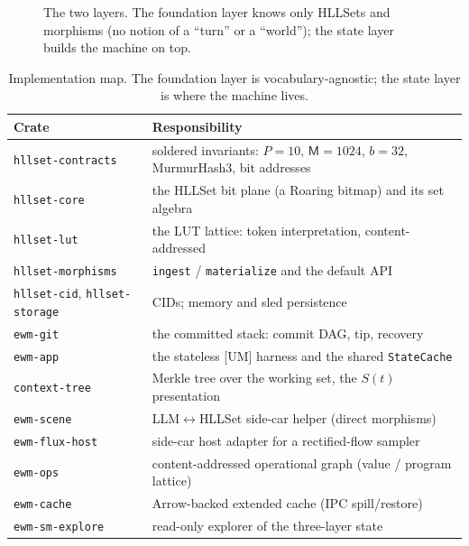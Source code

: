 \documentclass[11pt,a4paper]{article}
\theoremstyle{remark}
\newcommand{\Reg}{\ensuremath{\mathsf{M}}}            %
\newcommand{\Prec}{\ensuremath{P}}                    %
\newcommand{\Bits}{\ensuremath{b}}                    %
\begin{document}
\begin{figure}[t]
\caption{The two layers. The foundation layer knows only HLLSets and morphisms
(no notion of a ``turn'' or a ``world''); the state layer builds the machine on
top.}
\label{fig:layers}
\end{figure}

\begin{table}[t]
\centering
\small
\begin{tabular}{@{}p{}p{}@{}}
\toprule
Crate & Responsibility \\
\midrule
\texttt{hllset-contracts} & soldered invariants: $\Prec=10$, $\Reg=1024$, $\Bits=32$, MurmurHash3, bit addresses \\
\texttt{hllset-core} & the HLLSet bit plane (a Roaring bitmap) and its set algebra \\
\texttt{hllset-lut} & the LUT lattice: token interpretation, content-addressed \\
\texttt{hllset-morphisms} & \texttt{ingest} / \texttt{materialize} and the default API \\
\texttt{hllset-cid}, \texttt{hllset-storage} & CIDs; memory and sled persistence \\
\texttt{ewm-git} & the committed stack: commit DAG, tip, recovery \\
\texttt{ewm-app} & the stateless [UM] harness and the shared \texttt{StateCache} \\
\texttt{context-tree} & Merkle tree over the working set, the $S(t)$ presentation \\
\texttt{ewm-scene} & LLM$\leftrightarrow$HLLSet side-car helper (direct morphisms) \\
\texttt{ewm-flux-host} & side-car host adapter for a rectified-flow sampler \\
\texttt{ewm-ops} & content-addressed operational graph (value / program lattice) \\
\texttt{ewm-cache} & Arrow-backed extended cache (IPC spill/restore) \\
\texttt{ewm-sm-explore} & read-only explorer of the three-layer state \\
\bottomrule
\end{tabular}
\caption{Implementation map. The foundation layer is vocabulary-agnostic; the
state layer is where the machine lives.}
\label{tab:crates}
\end{table}
\end{document}
